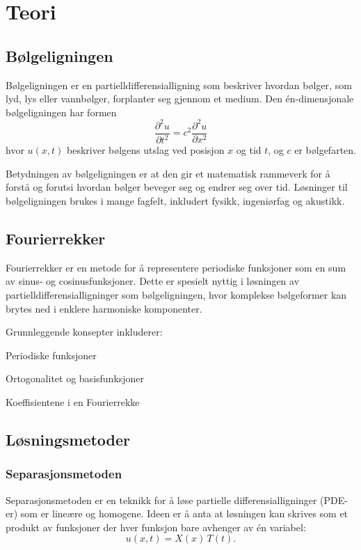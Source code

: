 \section{Teori}
\subsection{Bølgeligningen}

    Bølgeligningen er en partielldifferensialligning som beskriver hvordan bølger, som lyd, lys eller vannbølger, forplanter seg gjennom et medium. Den én-dimensjonale bølgeligningen har formen
    \[
    \frac{\partial^2 u}{\partial t^2} = c^2 \frac{\partial^2 u}{\partial x^2}
    \]
    hvor $u(x,t)$ beskriver bølgens utslag ved posisjon $x$ og tid $t$, og $c$ er bølgefarten.

    Betydningen av bølgeligningen er at den gir et matematisk rammeverk for å forstå og forutsi hvordan bølger beveger seg og endrer seg over tid. Løsninger til bølgeligningen brukes i mange fagfelt, inkludert fysikk, ingeniørfag og akustikk.
 

\subsection{Fourierrekker}
    Fourierrekker er en metode for å representere periodiske funksjoner som en sum av sinus- og cosinusfunksjoner. Dette er spesielt nyttig i løsningen av partielldifferensialligninger som bølgeligningen, hvor komplekse bølgeformer kan brytes ned i enklere harmoniske komponenter.    
    
    Grunnleggende konsepter inkluderer:

    Periodiske funksjoner

    Ortogonalitet og basisfunksjoner

    Koeffisientene i en Fourierrekke
\subsection{Løsningsmetoder}

\subsubsection{Separasjonsmetoden}

    Separasjonsmetoden er en teknikk for å løse partielle differensialligninger (PDE-er) som er lineære og homogene. Ideen er å anta at løsningen kan skrives som et produkt av funksjoner der hver funksjon bare avhenger av én variabel:
    \[
    u(x,t) = X(x)\,T(t).
    \]

